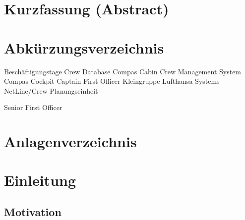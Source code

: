 \documentclass [12pt, a4paper, oneside, titlepage, ngerman]{article}
\begin{document}
\tableofcontents
\newpage


\section*{Kurzfassung (Abstract)}
\newpage


\section*{Abkürzungsverzeichnis}

\begin{acronym}

 {Beschäftigungstage}
 {Crew Database}
 {Compas Cabin}
 {Crew Management System}
 {Compas Cockpit}
 {Captain}
 {First Officer}
 {Kleingruppe}
 {Lufthansa Systems}
 {NetLine/Crew}
 {Planungseinheit}

 {Senior First Officer}


\end{acronym}
\newpage


\listoffigures
\newpage

\section*{Anlagenverzeichnis}
\newpage

\setcounter{page}{1}
\section{Einleitung}
\subsection {Motivation}
\end{document}
